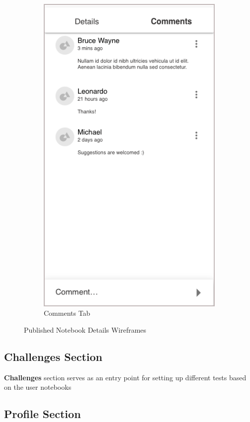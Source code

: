 \documentclass[thesis=B,english]{FITthesis}[2012/10/20]
\begin{document}
\begin{figure}[h]
\begin{subfigure}{.5\textwidth}
\end{subfigure}%
\begin{subfigure}{.5\textwidth}
  \includegraphics[scale=0.5]{details}
  \caption{Comments Tab}
  \label{fig:published-comments}
\end{subfigure}


\caption{Published Notebook Details Wireframes}
\label{fig:section-published}
\end{figure}

\subsection{Challenges Section}

\textbf{Challenges} section serves as an entry point for setting up different tests based on the user notebooks
\subsection{Profile Section}
\end{document}
